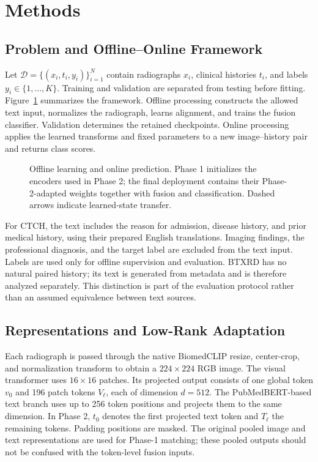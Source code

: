 \documentclass{llncs}
\begin{document}
\section{Methods}
\subsection{Problem and Offline--Online Framework}
Let $\mathcal D=\{(x_i,t_i,y_i)\}_{i=1}^{N}$ contain radiographs $x_i$, clinical histories $t_i$, and labels $y_i\in\{1,\ldots,K\}$. Training and validation are separated from testing before fitting. Figure~\ref{fig:framework} summarizes the framework. Offline processing constructs the allowed text input, normalizes the radiograph, learns alignment, and trains the fusion classifier. Validation determines the retained checkpoints. Online processing applies the learned transforms and fixed parameters to a new image--history pair and returns class scores.

\begin{figure}[t]
\centering\resizebox{\textwidth}{!}{}
\caption{Offline learning and online prediction. Phase 1 initializes the encoders used in Phase 2; the final deployment contains their Phase-2-adapted weights together with fusion and classification. Dashed arrows indicate learned-state transfer.}
\label{fig:framework}
\end{figure}

For CTCH, the text includes the reason for admission, disease history, and prior medical history, using their prepared English translations. Imaging findings, the professional diagnosis, and the target label are excluded from the text input. Labels are used only for offline supervision and evaluation. BTXRD has no natural paired history; its text is generated from metadata and is therefore analyzed separately. This distinction is part of the evaluation protocol rather than an assumed equivalence between text sources.

\subsection{Representations and Low-Rank Adaptation}
Each radiograph is passed through the native BiomedCLIP resize, center-crop, and normalization transform to obtain a $224\times224$ RGB image. The visual transformer uses $16\times16$ patches. Its projected output consists of one global token $v_0$ and 196 patch tokens $V_\ell$, each of dimension $d=512$. The PubMedBERT-based text branch uses up to 256 token positions and projects them to the same dimension. In Phase 2, $t_0$ denotes the first projected text token and $T_\ell$ the remaining tokens. Padding positions are masked. The original pooled image and text representations are used for Phase-1 matching; these pooled outputs should not be confused with the token-level fusion inputs.
\end{document}
